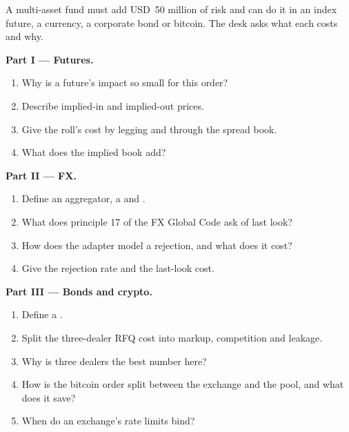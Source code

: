 \begin{problem}\label{pb:mx:execution-beyond-equities:1}
A multi-asset fund must add USD~50 million of risk and can do it in an index future, a currency, a corporate bond or bitcoin. The desk asks what each
costs and why.

\medskip\noindent\textbf{Part I --- Futures.}
\begin{enumerate}
\item Why is a future's impact so small for this order?
\item Describe implied-in and implied-out prices.
\item Give the roll's cost by legging and through the spread book.
\item What does the implied book add?
\end{enumerate}

\medskip\noindent\textbf{Part II --- FX.}
\begin{enumerate}[resume]
\item Define an aggregator, a  and .
\item What does principle 17 of the FX Global Code ask of last look?
\item How does the adapter model a rejection, and what does it cost?
\item Give the rejection rate and the last-look cost.
\end{enumerate}

\medskip\noindent\textbf{Part III --- Bonds and crypto.}
\begin{enumerate}[resume]
\item Define a .
\item Split the three-dealer RFQ cost into markup, competition and leakage.
\item Why is three dealers the best number here?
\item How is the bitcoin order split between the exchange and the pool, and what does it save?
\item When do an exchange's rate limits bind?
\end{enumerate}


\end{problem}
